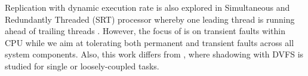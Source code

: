 Replication with dynamic execution rate is also explored in Simultaneous and Redundantly Threaded (SRT) processor whereby one leading thread is running ahead of trailing threads \cite{reinhardt2000transient}. However, 
the focus of \cite{reinhardt2000transient} is on transient faults within CPU while we aim at tolerating both permanent and transient faults across all system components.
Also, this work differs from \cite{mills_2014_icnc,cui_en7085151,cui_2014_closer}, where shadowing with DVFS is studied for single or loosely-coupled tasks. %
